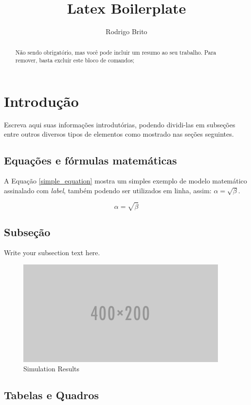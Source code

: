 \documentclass{article}
\begin{document}
\title{Latex Boilerplate}
\author{Rodrigo Brito}

\maketitle

\begin{abstract}
Não sendo obrigatório, mas você pode incluir um resumo ao seu trabalho. Para remover, basta excluir este bloco de comandos;
\end{abstract}

\section{Introdução}
Escreva aqui suas informações introdutórias, podendo dividi-las em subseções entre outros diversos tipos de elementos como mostrado nas seções seguintes.

\subsection{Equações e fórmulas matemáticas}

A Equação \ref{simple_equation} mostra um simples exemplo de modelo matemático assinalado com \textit{label}, também podendo ser utilizados em linha, assim: $\alpha = \sqrt{ \beta }$.

\begin{equation}
    \label{simple_equation}
    \alpha = \sqrt{ \beta }
\end{equation}

\subsection{Subseção}
Write your subsection text here.

\begin{figure}[!htp]
    \centering
    \includegraphics[width=0.5\linewidth]{fig/image.png}
    \caption{Simulation Results}
    \label{figura}
\end{figure}

\subsection{Tabelas e Quadros}
\end{document}
